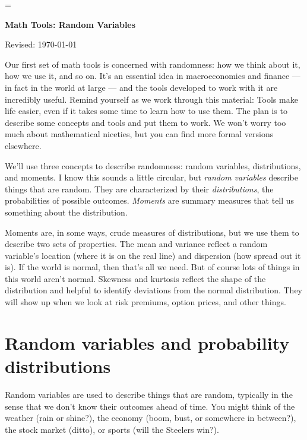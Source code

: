 \documentclass[11pt]{article}
\begin{document}
\parskip=\bigskipamount
\parindent=0.0in
\thispagestyle{empty}


\bigskip\bigskip
\centerline{\Large \bf Math Tools:  Random Variables}
\centerline{Revised: \today}

\medskip
Our first set of math tools is concerned with randomness:
how we think about it, how we use it, and so on.
It's an essential idea in macroeconomics and finance ---
in fact in the world at large --- and the tools developed
to work with it are incredibly useful.
Remind yourself as we work through this material:
Tools make life easier,
even if it takes some time to learn how to use them.
The plan is to describe some concepts and tools and put them to work.
We won't worry too much about mathematical niceties, but
you can find more formal versions elsewhere.

We'll use three concepts to describe randomness:  random variables, distributions, and moments.
I know this sounds a little circular, but {\it random variables\/} describe things that are random.
They are characterized by their {\it distributions\/},
the probabilities of possible outcomes.
{\it Moments\/} are summary measures that tell us something about
the distribution.

Moments are, in some ways, crude measures of distributions,
but we use them to describe two sets of properties.
The mean and variance reflect a random variable's
location (where it is on the real line)
and dispersion (how spread out it is).
If the world is normal, then that's all we need.
But of course lots of things in this world aren't normal.
Skewness and kurtosis reflect the shape of the distribution
and helpful to identify deviations from the normal distribution.
They will show up when we look at risk premiums, option prices,
and other things.


\section{Random variables and probability distributions}

Random variables are used to describe things that are random,
typically in the sense that we don't know their outcomes ahead of time.
You might think of the weather (rain or shine?),
the economy (boom, bust, or somewhere in between?),
the stock market (ditto),
or sports (will the Steelers win?).
\end{document}
